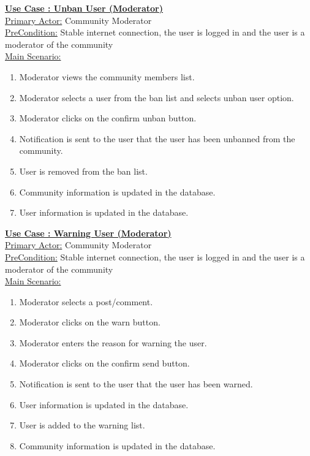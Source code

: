 \documentclass[conference,compsoc]{IEEEtran}
\newcounter{UC}
\newcommand{\nextU}{\stepcounter{UC}\theUC}
\begin{document}
\underline{\textbf{Use Case \nextU: Unban User (Moderator)}}\\

\underline{Primary Actor:} Community Moderator\\

\underline{PreCondition:} Stable internet connection, the user is logged in and the user is a moderator of the community\\

\underline{Main Scenario:}\\
\begin{enumerate}
    \item Moderator views the community members list.
    \item Moderator selects a user from the ban list and selects unban user option.
    \item Moderator clicks on the confirm unban button.
    \item Notification is sent to the user that the user has been unbanned from the community.
    \item User is removed from the ban list.
    \item Community information is updated in the database.
    \item User information is updated in the database.
\end{enumerate}

\underline{\textbf{Use Case \nextU: Warning User (Moderator)}}\\

\underline{Primary Actor:} Community Moderator\\

\underline{PreCondition:} Stable internet connection, the user is logged in and the user is a moderator of the community\\

\underline{Main Scenario:}\\
\begin{enumerate}
    \item Moderator selects a post/comment.
    \item Moderator clicks on the warn button.
    \item Moderator enters the reason for warning the user.
    \item Moderator clicks on the confirm send button.
    \item Notification is sent to the user that the user has been warned.
    \item User information is updated in the database.
    \item User is added to the warning list.
    \item Community information is updated in the database.
\end{enumerate}
\end{document}
